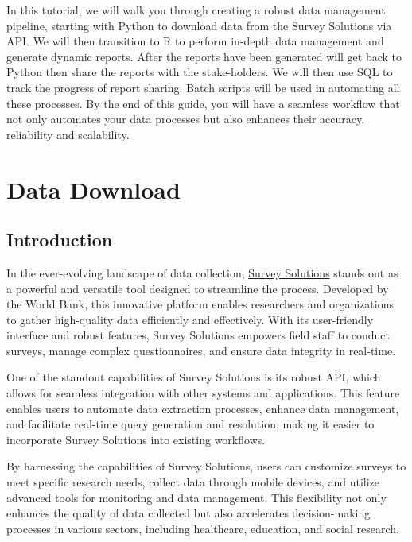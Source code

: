 \documentclass[
  letterpaper,
  DIV=11,
  numbers=noendperiod]{scrreprt}
\begin{document}
In this tutorial, we will walk you through creating a robust data
management pipeline, starting with Python to download data from the
Survey Solutions via API. We will then transition to R to perform
in-depth data management and generate dynamic reports. After the reports
have been generated will get back to Python then share the reports with
the stake-holders. We will then use SQL to track the progress of report
sharing. Batch scripts will be used in automating all these processes.
By the end of this guide, you will have a seamless workflow that not
only automates your data processes but also enhances their accuracy,
reliability and scalability.


\chapter{Data Download}\label{data-download}

\section{Introduction}\label{introduction-1}

In the ever-evolving landscape of data collection,
\href{https://mysurvey.solutions/en/}{Survey Solutions} stands out as a
powerful and versatile tool designed to streamline the process.
Developed by the World Bank, this innovative platform enables
researchers and organizations to gather high-quality data efficiently
and effectively. With its user-friendly interface and robust features,
Survey Solutions empowers field staff to conduct surveys, manage complex
questionnaires, and ensure data integrity in real-time.

One of the standout capabilities of Survey Solutions is its robust API,
which allows for seamless integration with other systems and
applications. This feature enables users to automate data extraction
processes, enhance data management, and facilitate real-time query
generation and resolution, making it easier to incorporate Survey
Solutions into existing workflows.

By harnessing the capabilities of Survey Solutions, users can customize
surveys to meet specific research needs, collect data through mobile
devices, and utilize advanced tools for monitoring and data management.
This flexibility not only enhances the quality of data collected but
also accelerates decision-making processes in various sectors, including
healthcare, education, and social research.
\end{document}
